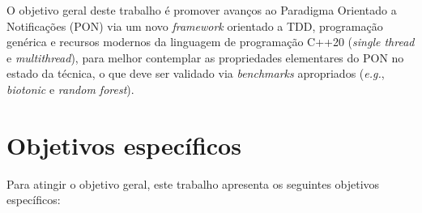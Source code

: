 O objetivo geral deste trabalho é promover avanços ao Paradigma Orientado a
Notificações (PON) via um novo \textit{framework} orientado a TDD, programação
genérica e recursos modernos da linguagem de programação C++20 (\textit{single
thread} e \textit{multithread}), para melhor contemplar as propriedades
elementares do PON no estado da técnica, o que deve ser validado via
\textit{benchmarks} apropriados (\textit{e.g.}, \textit{biotonic} e
\textit{random forest}).

\section{Objetivos específicos}\label{sec:obj_especificos}

Para atingir o objetivo geral, este trabalho apresenta os seguintes objetivos
específicos:

